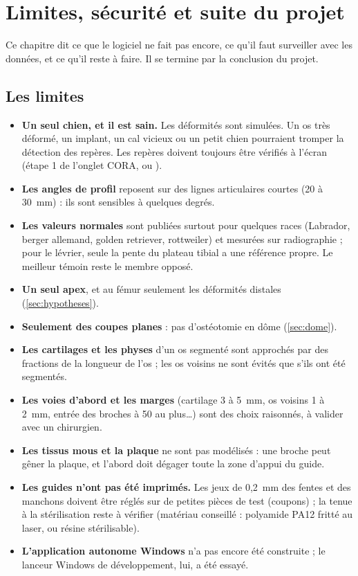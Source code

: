 \chapter{Limites, sécurité et suite du projet}
\label{chap:limites}

\begin{chapeau}
Ce chapitre dit ce que le logiciel ne fait pas encore, ce qu'il faut surveiller avec les données, et ce qu'il reste à
faire. Il se termine par la conclusion du projet.
\end{chapeau}

\section{Les limites}

\begin{itemize}
  \item \textbf{Un seul chien, et il est sain.} Les déformités sont simulées. Un os très déformé, un implant, un cal
  vicieux ou un petit chien pourraient tromper la détection des repères. Les repères doivent toujours être vérifiés à
  l'écran (étape 1 de l'onglet CORA, ou ).
  \item \textbf{Les angles de profil} reposent sur des lignes articulaires courtes (20 à 30~mm) : ils sont sensibles à
  quelques degrés.
  \item \textbf{Les valeurs normales} sont publiées surtout pour quelques races (Labrador, berger allemand, golden
  retriever, rottweiler) et mesurées sur radiographie ; pour le lévrier, seule la pente du plateau tibial a une
  référence propre. Le meilleur témoin reste le membre opposé.
  \item \textbf{Un seul apex}, et au fémur seulement les déformités distales (\cref{sec:hypotheses}).
  \item \textbf{Seulement des coupes planes} : pas d'ostéotomie en dôme (\cref{sec:dome}).
  \item \textbf{Les cartilages et les physes} d'un os segmenté sont approchés par des fractions de la longueur de l'os ;
  les os voisins ne sont évités que s'ils ont été segmentés.
  \item \textbf{Les voies d'abord et les marges} (cartilage 3 à 5~mm, os voisins 1 à 2~mm, entrée des broches à
  50\degre{} au plus\ldots) sont des choix raisonnés, à valider avec un chirurgien.
  \item \textbf{Les tissus mous et la plaque} ne sont pas modélisés : une broche peut gêner la plaque, et l'abord doit
  dégager toute la zone d'appui du guide.
  \item \textbf{Les guides n'ont pas été imprimés.} Les jeux de 0,2~mm des fentes et des manchons doivent être réglés
  sur de petites pièces de test (coupons) ; la tenue à la stérilisation reste à vérifier (matériau conseillé : polyamide
  PA12 fritté au laser, ou résine stérilisable).
  \item \textbf{L'application autonome Windows} n'a pas encore été construite ; le lanceur Windows de développement,
  lui, a été essayé.
\end{itemize}

